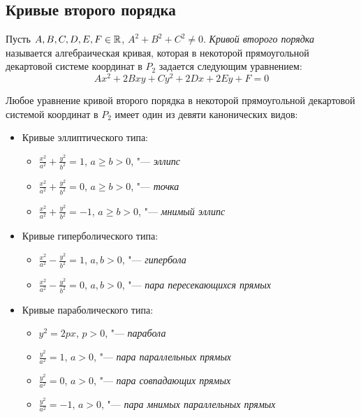 {	\subsection{Кривые второго порядка}
	
	\begin{definition}
		Пусть $A, B, C, D, E, F \in \mathbb{R}$, $A^2 + B^2 + C^2 \ne 0$. \textit{Кривой второго порядка} называется алгебраическая кривая, которая в некоторой прямоугольной декартовой системе координат в $P_2$ задается следующим уравнением:
		\[Ax^2 + 2Bxy + Cy^2 + 2Dx + 2Ey + F = 0\]
	\end{definition}
	
	\begin{theorem}
		Любое уравнение кривой второго порядка в некоторой прямоугольной декартовой системой координат в $P_2$ имеет один из девяти канонических видов:
		\begin{itemize}
			\item Кривые эллиптического типа:
			\begin{itemize}
				\item $\frac{x^2}{a^2} + \frac{y^2}{b^2} = 1$, $a \ge b > 0$, "--- \textit{эллипс}
				\item $\frac{x^2}{a^2} + \frac{y^2}{b^2} = 0$, $a \ge b > 0$, "--- \textit{точка}
				\item $\frac{x^2}{a^2} + \frac{y^2}{b^2} = -1$, $a \ge b > 0$, "--- \textit{мнимый эллипс}
			\end{itemize}
			
			\item Кривые гиперболического типа:
			\begin{itemize}
				\item $\frac{x^2}{a^2} - \frac{y^2}{b^2} = 1$, $a, b > 0$, "--- \textit{гипербола}
				\item $\frac{x^2}{a^2} - \frac{y^2}{b^2} = 0$, $a, b > 0$, "--- \textit{пара пересекающихся прямых}
			\end{itemize}
			
			\item Кривые параболического типа:
			\begin{itemize}
				\item $y^2 = 2px$, $p > 0$, "--- \textit{парабола}
				\item $\frac{y^2}{a^2} = 1$, $a > 0$, "--- \textit{пара параллельных прямых}
				\item $\frac{y^2}{a^2} = 0$, $a > 0$, "--- \textit{пара совпадающих прямых}
				\item $\frac{y^2}{a^2} = -1$, $a > 0$, "--- \textit{пара мнимых параллельных прямых}
			\end{itemize}
		\end{itemize}
	\end{theorem}
	
}
